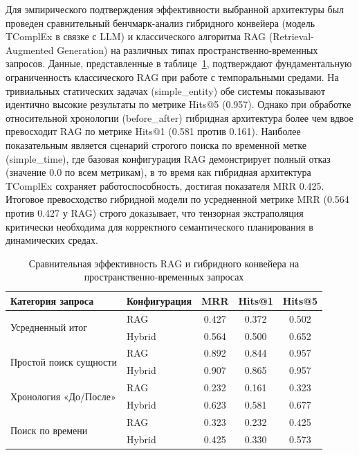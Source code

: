 Для эмпирического подтверждения эффективности выбранной архитектуры был проведен сравнительный бенчмарк-анализ гибридного конвейера (модель TComplEx в связке с LLM) и классического алгоритма RAG (Retrieval-Augmented Generation) на различных типах пространственно-временных запросов. Данные, представленные в таблице~\ref{tab:benchmark_results}, подтверждают фундаментальную ограниченность классического RAG при работе с темпоральными средами. На тривиальных статических задачах (simple\_entity) обе системы показывают идентично высокие результаты по метрике Hits@5 (0.957). Однако при обработке относительной хронологии (before\_after) гибридная архитектура более чем вдвое превосходит RAG по метрике Hits@1 (0.581 против 0.161). Наиболее показательным является сценарий строгого поиска по временной метке (simple\_time), где базовая конфигурация RAG демонстрирует полный отказ (значение 0.0 по всем метрикам), в то время как гибридная архитектура TComplEx сохраняет работоспособность, достигая показателя MRR 0.425. Итоговое превосходство гибридной модели по усредненной метрике MRR (0.564 против 0.427 у RAG) строго доказывает, что тензорная экстраполяция критически необходима для корректного семантического планирования в динамических средах.

\begin{table}[htbp]
\caption{Сравнительная эффективность RAG и гибридного конвейера на пространственно-временных запросах}
\label{tab:benchmark_results}
\centering
\begin{tabular}{p{5cm}p{3cm}ccc}
\hline
Категория запроса & Конфигурация & MRR & Hits@1 & Hits@5 \\
\hline
\multirow{2}{5cm}{Усредненный итог} & RAG & 0.427 & 0.372 & 0.502 \\
 & Hybrid & 0.564 & 0.500 & 0.652 \\
\hline
\multirow{2}{5cm}{Простой поиск сущности} & RAG & 0.892 & 0.844 & 0.957 \\
 & Hybrid & 0.907 & 0.865 & 0.957 \\
\hline
\multirow{2}{5cm}{Хронология «До/После»} & RAG & 0.232 & 0.161 & 0.323 \\
 & Hybrid & 0.623 & 0.581 & 0.677 \\
\hline
\multirow{2}{5cm}{Поиск по времени} & RAG & 0.323 & 0.232 & 0.425 \\
 & Hybrid & 0.425 & 0.330 & 0.573 \\
\hline
\end{tabular}
\end{table}


